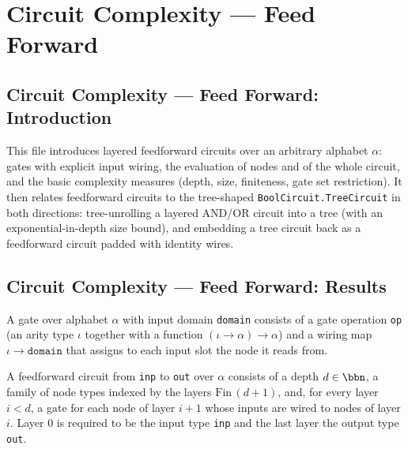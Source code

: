 \section{Circuit Complexity --- Feed Forward}
\subsection*{Circuit Complexity --- Feed Forward: Introduction}

This file introduces layered feedforward circuits over an arbitrary alphabet $\alpha$:
gates with explicit input wiring, the evaluation of nodes and of the whole circuit,
and the basic complexity measures (depth, size, finiteness, gate set restriction).
It then relates feedforward circuits to the tree-shaped \texttt{BoolCircuit.TreeCircuit}
in both directions: tree-unrolling a layered AND/OR circuit into a tree (with an
exponential-in-depth size bound), and embedding a tree circuit back as a
feedforward circuit padded with identity wires.

\subsection*{Circuit Complexity --- Feed Forward: Results}

\begin{definition}
\label{BoolCircuit.Gate}
\leanok
{}
A gate over alphabet $\alpha$ with input domain \texttt{domain} consists of a gate
operation \texttt{op} (an arity type $\iota$ together with a function
$(\iota \to \alpha) \to \alpha$) and a wiring map $\iota \to \texttt{domain}$ that
assigns to each input slot the node it reads from.
\end{definition}

\begin{definition}
\label{BoolCircuit.LayeredCircuit}
\leanok
{}
A feedforward circuit from \texttt{inp} to \texttt{out} over $\alpha$ consists of a
depth $d \in \bbn$, a family of node types indexed by the layers
$\mathrm{Fin}\,(d+1)$, and, for every layer $i < d$, a gate for each node of layer
$i+1$ whose inputs are wired to nodes of layer $i$. Layer $0$ is required to be the
input type \texttt{inp} and the last layer the output type \texttt{out}.
\end{definition}

